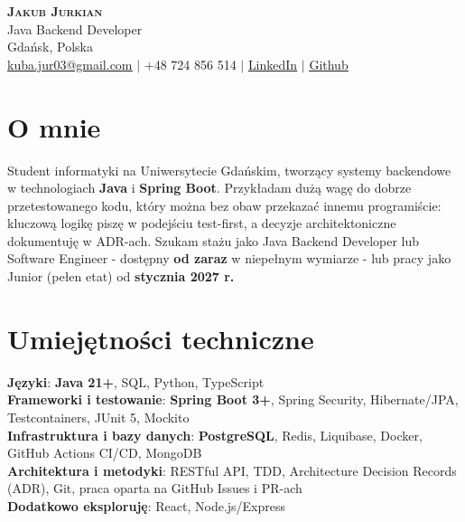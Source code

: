 \documentclass[a4paper,10pt]{article}
\begin{document}
\begin{center}
    \textbf{\Huge \scshape Jakub Jurkian} \\ \vspace{3pt}
    {\large \color{TechBlue} Java Backend Developer} \\ \vspace{3pt}
    Gdańsk, Polska \\ \vspace{2pt}
    \small
    \href{mailto:kuba.jur03@gmail.com}{\uline{kuba.jur03@gmail.com}} $|$
    +48 724 856 514 $|$
    \href{https://linkedin.com/in/jakub-jurkian}{\uline{LinkedIn}} $|$
    \href{https://github.com/jakub-jurkian}{\uline{Github}}
\end{center}

\section{O mnie}
{\justifying \small Student informatyki na Uniwersytecie Gdańskim, tworzący systemy backendowe w technologiach \textbf{Java} i \textbf{Spring Boot}. Przykładam dużą wagę do dobrze przetestowanego kodu, który można bez obaw przekazać innemu programiście: kluczową logikę piszę w podejściu test-first, a decyzje architektoniczne dokumentuję w ADR-ach. Szukam stażu jako Java Backend Developer lub Software Engineer - dostępny \textbf{od zaraz} w niepełnym wymiarze - lub pracy jako Junior (pełen etat) od \textbf{stycznia 2027 r.}\par}

\section{Umiejętności techniczne}
 \begin{itemize}[leftmargin=0.15in, label={}, topsep=0pt]
    \small{\item{
     \textbf{Języki}{: \textbf{Java 21+}, SQL, Python, TypeScript} \\
     \textbf{Frameworki i testowanie}{: \textbf{Spring Boot 3+}, Spring Security, Hibernate/JPA, Testcontainers, JUnit 5, Mockito} \\
     \textbf{Infrastruktura i bazy danych}{: \textbf{PostgreSQL}, Redis, Liquibase, Docker, GitHub Actions CI/CD, MongoDB} \\
     \textbf{Architektura i metodyki}{: RESTful API, TDD, Architecture Decision Records (ADR), Git, praca oparta na GitHub Issues i PR-ach} \\
     \textbf{Dodatkowo eksploruję}{: React, Node.js/Express}
    }}
 \end{itemize}
\end{document}
